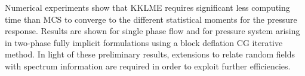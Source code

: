 \documentclass{report}
\begin{document}
Numerical experiments show that KKLME requires significant less computing
time than MCS to converge to the different statistical moments for the
pressure response. Results are shown for single phase flow and for
pressure system arising in two-phase fully implicit formulations using a
block deflation CG iterative method. In light of these preliminary
results, extensions to relate random fields with spectrum information are
required in order to exploit further efficiencies.
\end{document}
